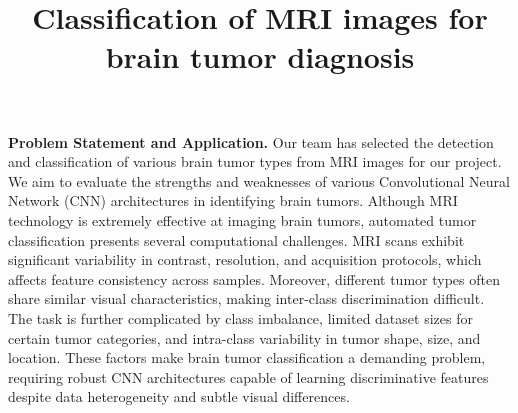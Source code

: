 \documentclass[10pt,twocolumn,letterpaper]{article}
\begin{document}
\title{Classification of MRI images for brain tumor diagnosis}  %


\maketitle
\thispagestyle{empty}
\appendix

\textbf{Problem Statement and Application.} Our team has selected the detection and classification of various brain tumor types from MRI images for our project. We aim to evaluate the strengths and weaknesses of various Convolutional Neural Network (CNN) architectures in identifying brain tumors. Although MRI technology is extremely effective at imaging brain tumors\cite{mri}, automated tumor classification presents several computational challenges. MRI scans exhibit significant variability in contrast, resolution, and acquisition protocols\cite{mri_variability}, which affects feature consistency across samples. Moreover, different tumor types often share similar visual characteristics, making inter-class discrimination difficult. The task is further complicated by class imbalance, limited dataset sizes for certain tumor categories, and intra-class variability in tumor shape, size, and location. These factors make brain tumor classification a demanding problem, requiring robust CNN architectures capable of learning discriminative features despite data heterogeneity and subtle visual differences.
\end{document}
